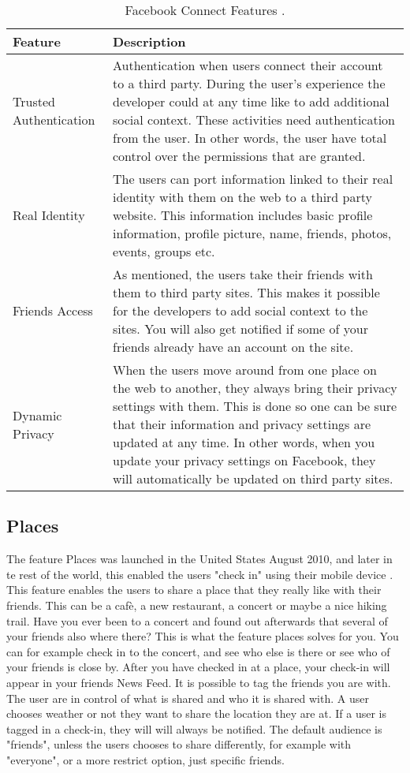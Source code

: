 \begin{center}
\begin{table}[!ht]
\caption{\label{tab:connect}Facebook Connect Features \cite{connect, connect2}.}
    \begin{tabular}{ | l | p{9cm} |}
    \hline
    \textbf{Feature} & \textbf{Description} \\ 
    \hline
    Trusted Authentication & Authentication when users connect their account to a third party. During the user's experience the developer could at any time like to add additional social context. These activities need authentication from the user. In other words, the user have total control over the permissions that are granted. \\ 
    \hline
    Real Identity &  The users can port information linked to their real identity with them on the web to a third party website. This information includes basic profile information, profile picture, name, friends, photos, events, groups etc. \\ 
    \hline
    Friends Access & As mentioned, the users take their friends with them to third party sites. This makes it possible for the developers to add social context to the sites. You will also get notified if some of your friends already have an account on the site.\\
    \hline
    Dynamic Privacy & When the users move around from one place on the web to another, they always bring their privacy settings with them. This is done so one can be sure that their information and privacy settings are updated at any time. In other words, when you update your privacy settings on Facebook, they will automatically be updated on third party sites.\\
	\hline
    \end{tabular}
   \end{table}
\end{center}


\subsection{Places}
The feature Places was launched in the United States August 2010, and later in te rest of the world, this enabled the users "check in" using their mobile device \cite{checkIn}. This feature enables the users to share a place that they really like with their friends. This can be a cafè, a new restaurant, a concert or maybe a nice hiking trail. Have you ever been to a concert and found out afterwards that several of your friends also where there? This is what the feature places solves for you. You can for example check in to the concert, and see who else is there or see who of your friends is close by. After you have checked in at a place, your check-in will appear in your friends News Feed. It is possible to tag the friends you are with. The user are in control of what is shared and who it is shared with. A user chooses weather or not they want to share the location they are at. If a user is tagged in a check-in, they will will always be notified. The default audience is "friends", unless the users chooses to share differently, for example with "everyone", or a more restrict option, just specific friends. 

